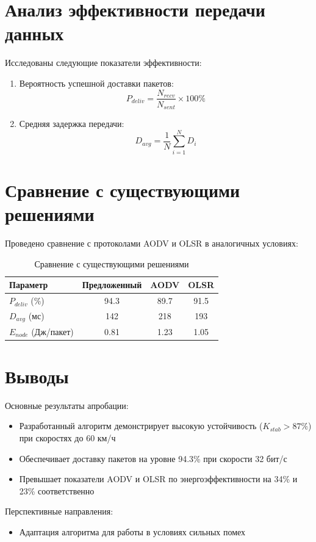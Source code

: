 \section{Анализ эффективности передачи данных} \label{ch4:sec2}

Исследованы следующие показатели эффективности:

\begin{enumerate}
    \item Вероятность успешной доставки пакетов:
    \begin{equation}
    P_{deliv} = \frac{N_{recv}}{N_{sent}} \times 100\%
    \end{equation}
    
    \item Средняя задержка передачи:
    \begin{equation}
    D_{avg} = \frac{1}{N}\sum_{i=1}^{N}D_i
    \end{equation}
\end{enumerate}


\section{Сравнение с существующими решениями} \label{ch4:sec3}

Проведено сравнение с протоколами AODV и OLSR в аналогичных условиях:

\begin{table}[h]
\centering
\begin{tabular}{|l|c|c|c|}
\hline
Параметр & Предложенный & AODV & OLSR \\ \hline
$P_{deliv}$ (\%) & 94.3 & 89.7 & 91.5 \\ \hline
$D_{avg}$ (мс) & 142 & 218 & 193 \\ \hline
$E_{node}$ (Дж/пакет) & 0.81 & 1.23 & 1.05 \\ \hline
\end{tabular}
\caption{Сравнение с существующими решениями}
\label{tab:comparison}
\end{table}

\section{Выводы} \label{ch4:conclusion}

Основные результаты апробации:
\begin{itemize}
    \item Разработанный алгоритм демонстрирует высокую устойчивость ($K_{stab} > 87\%$) при скоростях до 60 км/ч
    \item Обеспечивает доставку пакетов на уровне 94.3\% при скорости 32 бит/с
    \item Превышает показатели AODV и OLSR по энергоэффективности на 34\% и 23\% соответственно
\end{itemize}

Перспективные направления:
\begin{itemize}
    \item Адаптация алгоритма для работы в условиях сильных помех
\end{itemize}